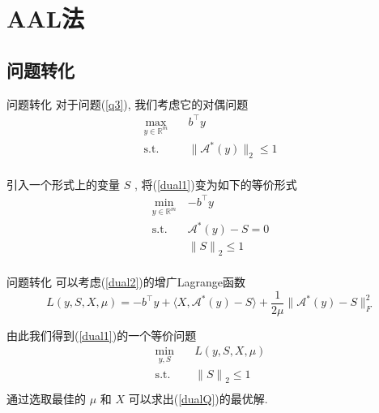 \documentclass[slidestop,compress,mathserif,UTF8]{beamer}
\numberwithin{equation}{section}                                %
\begin{document}
    \section{AAL法}\label{section2}
        \subsection{问题转化}
            \begin{frame}[t]{问题转化}
                对于问题(\ref{q3}), 我们考虑它的对偶问题
                \begin{equation}
                    \begin{split}\label{dual1}
                        \max_{y \in \mathbb{R}^{m}} \quad
                            & b^\top y\\
                        \text{s.t.} \quad
                            & \lVert{\mathcal{A}^*(y)}\rVert_2 \le 1\\
                    \end{split}
                \end{equation}

                引入一个形式上的变量 $S$ , 将(\ref{dual1})变为如下的等价形式
                \begin{equation}
                    \begin{split}\label{dual2}
                        \min_{y \in \mathbb{R}^{m}}
                            & -b^\top y\\
                        \text{s.t.} \quad
                            & \mathcal{A}^*(y) - S = 0\\
                            & {\lVert{S}\rVert}_2 \le 1\\
                    \end{split}
                \end{equation}
            \end{frame}
            \begin{frame}[t]{问题转化}
                可以考虑(\ref{dual2})的增广Lagrange函数
                \begin{equation}\label{Lag}
                        L(y, S, X, \mu)
                    =	-b^\top y + \langle{X, \mathcal{A}^*(y) - S}\rangle + \frac{1}{2\mu} \lVert{\mathcal{A}^*(y) - S}\rVert^2_F
                \end{equation}

                由此我们得到(\ref{dual1})的一个等价问题
                \begin{equation}
                    \begin{split}\label{dualQ}
                        \min_{y,S} \quad
                            & L(y, S, X, \mu)\\
                        \text{s.t.} \quad
                            & {\lVert{S}\rVert}_2 \le 1\\
                    \end{split}
                \end{equation}
                通过选取最佳的 $\mu$ 和 $X$ 可以求出(\ref{dualQ})的最优解.
            \end{frame}
\end{document}
